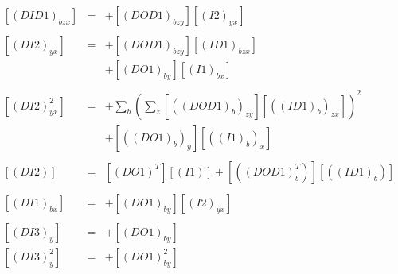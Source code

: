 \begin{eqnarray*}
\left[\left(DID1\right)_{bzx}\right] & = & +\left[\left(DOD1\right)_{bzy}\right]\left[\left(I2\right)_{yx}\right]\\
\\
\left[\left(DI2\right)_{yx}\right] & = & +\left[\left(DOD1\right)_{bzy}\right]\left[\left(ID1\right)_{bzx}\right]\\
 &  & +\left[\left(DO1\right)_{by}\right]\left[\left(I1\right)_{bx}\right]\\
\\
\left[\left(DI2\right)_{yx}^{2}\right] & = & +\sum_{b}\left(\sum_{z}\left[\left(\left(DOD1\right)_{b}\right)_{zy}\right]\left[\left(\left(ID1\right)_{b}\right)_{zx}\right]\right)^{2}\\
 &  & +\left[\left(\left(DO1\right)_{b}\right)_{y}\right]\left[\left(\left(I1\right)_{b}\right)_{x}\right]\\
\\
\left[\left(DI2\right)\right] & = & \left[\left(DO1\right)^{T}\right]\left[\left(I1\right)\right]+\left[\left(\left(DOD1\right)_{b}^{T}\right)\right]\left[\left(\left(ID1\right)_{b}\right)\right]\\
\\
\left[\left(DI1\right)_{bx}\right] & = & +\left[\left(DO1\right)_{by}\right]\left[\left(I2\right)_{yx}\right]\\
\\
\left[\left(DI3\right)_{y}\right] & = & +\left[\left(DO1\right)_{by}\right]\\
\left[\left(DI3\right)_{y}^{2}\right] & = & +\left[\left(DO1\right)_{by}^{2}\right]
\end{eqnarray*}